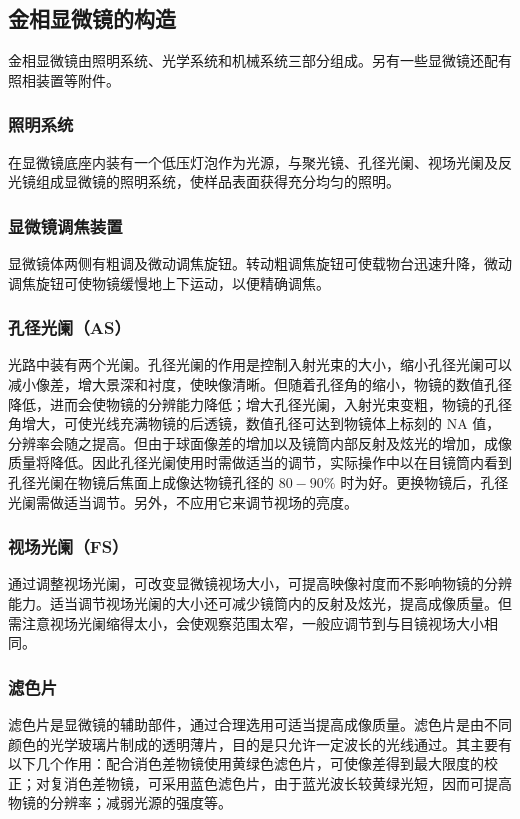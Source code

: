 \documentclass[a4paper,utf8]{article}
\begin{document}
    \subsection{金相显微镜的构造}
        金相显微镜由照明系统、光学系统和机械系统三部分组成。另有一些显微镜还配有照相装置等附件。
        \subsubsection{照明系统}
            在显微镜底座内装有一个低压灯泡作为光源，与聚光镜、孔径光阑、视场光阑及反光镜组成显微镜的照明系统，使样品表面获得充分均匀的照明。
        \subsubsection{显微镜调焦装置}
            显微镜体两侧有粗调及微动调焦旋钮。转动粗调焦旋钮可使载物台迅速升降，微动调焦旋钮可使物镜缓慢地上下运动，以便精确调焦。
        \subsubsection{孔径光阑（AS）}
            光路中装有两个光阑。孔径光阑的作用是控制入射光束的大小，缩小孔径光阑可以减小像差，增大景深和衬度，使映像清晰。但随着孔径角的缩小，物镜的数值孔径降低，进而会使物镜的分辨能力降低；增大孔径光阑，入射光束变粗，物镜的孔径角增大，可使光线充满物镜的后透镜，数值孔径可达到物镜体上标刻的 NA 值，分辨率会随之提高。但由于球面像差的增加以及镜筒内部反射及炫光的增加，成像质量将降低。因此孔径光阑使用时需做适当的调节，实际操作中以在目镜筒内看到孔径光阑在物镜后焦面上成像达物镜孔径的 $80-90\%$ 时为好。更换物镜后，孔径光阑需做适当调节。另外，不应用它来调节视场的亮度。
        \subsubsection{视场光阑（FS）}
            通过调整视场光阑，可改变显微镜视场大小，可提高映像衬度而不影响物镜的分辨能力。适当调节视场光阑的大小还可减少镜筒内的反射及炫光，提高成像质量。但需注意视场光阑缩得太小，会使观察范围太窄，一般应调节到与目镜视场大小相同。
        \subsubsection{滤色片}
            滤色片是显微镜的辅助部件，通过合理选用可适当提高成像质量。滤色片是由不同颜色的光学玻璃片制成的透明薄片，目的是只允许一定波长的光线通过。其主要有以下几个作用：配合消色差物镜使用黄绿色滤色片，可使像差得到最大限度的校正；对复消色差物镜，可采用蓝色滤色片，由于蓝光波长较黄绿光短，因而可提高物镜的分辨率；减弱光源的强度等。
\end{document}
